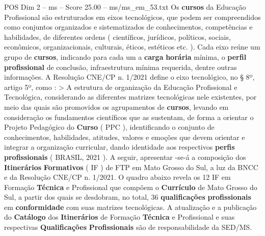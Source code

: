 \begin{textsample}{POS Dim 2 – ms – Score 25.00 – ms/ms\_em\_53.txt}
Os \textbf{cursos} da Educação Profissional são estruturados em eixos tecnológicos, que podem ser compreendidos como conjuntos organizados e sistematizados de conhecimentos, competências e habilidades, de diferentes ordens ( científicos, jurídicos, políticos, sociais, econômicos, organizacionais, culturais, éticos, estéticos etc. ).
Cada eixo reúne um grupo de \textbf{cursos}, indicando para cada um a \textbf{carga} \textbf{horária} mínima, o \textbf{perfil} \textbf{profissional} de conclusão, infraestrutura mínima requerida, dentre outras informações.
A Resolução CNE/CP n. 1/2021 define o eixo tecnológico, no § 8º, artigo 5º, como : > A estrutura de organização da Educação Profissional e Tecnológica, considerando as diferentes matrizes tecnológicas nele existentes, por meio das quais são promovidos os agrupamentos de \textbf{cursos}, levando em consideração os fundamentos científicos que as sustentam, de forma a orientar o Projeto Pedagógico do \textbf{Curso} ( PPC ), identificando o conjunto de conhecimentos, habilidades, atitudes, valores e emoções que devem orientar e integrar a organização curricular, dando identidade aos respectivos \textbf{perfis} \textbf{profissionais} ( BRASIL, 2021 ).
A seguir, apresentar -se-á a composição dos \textbf{Itinerários} \textbf{Formativos} ( IF ) de FTP em Mato Grosso do Sul, a luz da BNCC e da Resolução CNE/CP n. 1/2021.
O quadro abaixo revela os 12 IF em Formação \textbf{Técnica} e Profissional que compõem o \textbf{Currículo} de Mato Grosso do Sul, a partir dos quais se desdobram, no total, 36 \textbf{qualificações} \textbf{profissionais} em \textbf{conformidade} com suas matrizes tecnológicas.
A atualização e a publicação do \textbf{Catálogo} dos \textbf{Itinerários} de Formação \textbf{Técnica} e Profissional e suas respectivas \textbf{Qualificações} \textbf{Profissionais} são de responsabilidade da SED/MS.

\end{textsample}
